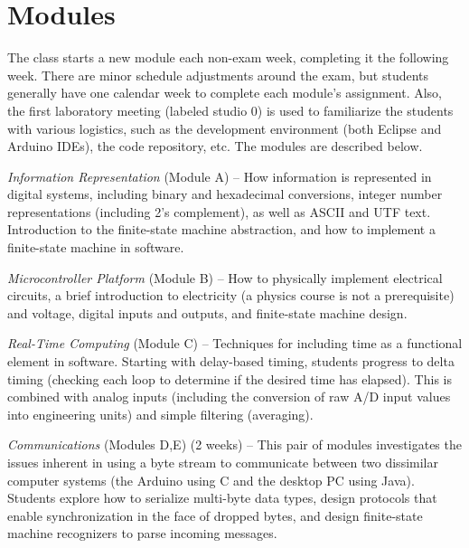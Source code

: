 \section{Modules}
\label{sec:weeks}

The class starts a new module each
non-exam week, completing it the following week. There are minor schedule
adjustments around the exam, but students generally have one calendar week
to complete each module's assignment.
Also, the first laboratory meeting (labeled studio 0) is used to familiarize
the students with various logistics, such as the development environment
(both Eclipse and Arduino IDEs),
the code repository, etc.
The modules are described below.

\emph{Information Representation} (Module A) --
How information is represented in digital systems, including binary and
hexadecimal conversions, integer
number representations (including 2's complement), as well as
ASCII and UTF text.
Introduction to the finite-state machine abstraction,
and how to implement a finite-state machine in software.

\emph{Microcontroller Platform} (Module B) --
How to physically implement electrical
circuits, a brief introduction to electricity (a physics course is not a
prerequisite) and voltage, digital inputs and outputs, and finite-state
machine design.

\emph{Real-Time Computing} (Module C) --
Techniques for including time as a functional
element in software. Starting with delay-based timing, students progress to delta
timing (checking each loop to determine if the desired time has elapsed).
This is combined with analog inputs (including the conversion of raw A/D
input values into engineering units) and simple filtering (averaging).

\emph{Communications} (Modules D,E) (2 weeks) --
This pair of modules investigates the issues inherent in using a byte stream
to communicate between two dissimilar computer systems (the Arduino using C
and the desktop PC using Java).  Students explore how
to serialize multi-byte data types, design protocols that enable synchronization
in the face of dropped bytes,
and design finite-state machine recognizers to parse incoming messages.


